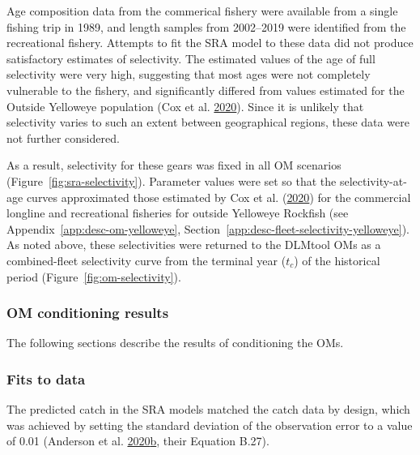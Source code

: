 \documentclass[11pt]{book}
\begin{document}
Age composition data from the commerical fishery were available from a single fishing trip in 1989, and length samples from 2002--2019 were identified from the recreational fishery. Attempts to fit the SRA model to these data did not produce satisfactory estimates of selectivity. The estimated values of the age of full selectivity were very high, suggesting that most ages were not completely vulnerable to the fishery, and significantly differed from values estimated for the Outside Yelloweye population (Cox et al. \protect\hyperlink{ref-cox2020}{2020}). Since it is unlikely that selectivity varies to such an extent between geographical regions, these data were not further considered.

As a result, selectivity for these gears was fixed in all OM scenarios (Figure~\ref{fig:sra-selectivity}). Parameter values were set so that the selectivity-at-age curves approximated those estimated by Cox et al. (\protect\hyperlink{ref-cox2020}{2020}) for the commercial longline and recreational fisheries for outside Yelloweye Rockfish (see Appendix~\ref{app:desc-om-yelloweye}, Section~\ref{app:desc-fleet-selectivity-yelloweye}). As noted above, these selectivities were returned to the DLMtool OMs as a combined-fleet selectivity curve from the terminal year (\(t_c\)) of the historical period (Figure~\ref{fig:om-selectivity}).

\hypertarget{sec:approach3-conditioning-results}{%
\subsubsection{OM conditioning results}\label{sec:approach3-conditioning-results}}

The following sections describe the results of conditioning the OMs.

\hypertarget{sec:approach3-conditioning-indices}{%
\subsubsection{Fits to data}\label{sec:approach3-conditioning-indices}}

The predicted catch in the SRA models matched the catch data by design, which was achieved by setting the standard deviation of the observation error to a value of 0.01 (Anderson et al. \protect\hyperlink{ref-anderson2020gfmp}{2020}\protect\hyperlink{ref-anderson2020gfmp}{b}, their Equation B.27).
\end{document}
